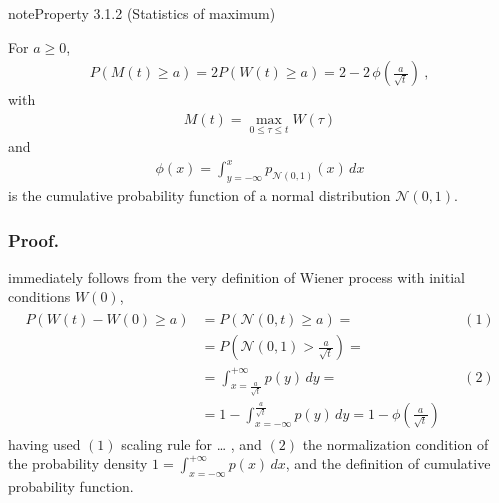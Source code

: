 \documentclass[letterpaper,10pt,english]{jupyterBook}
\begin{document}
\begin{sphinxadmonition}{note}{Property 3.1.2 (Statistics of maximum)}



\sphinxAtStartPar
For \(a \ge 0\),
\begin{equation*}
\begin{split}P\left( M(t) \ge a  \right) = 2 P \left( W(t) \ge a \right) = 2 - 2 \, \phi\left( \frac{a}{\sqrt{t}} \right) \ ,\end{split}
\end{equation*}
\sphinxAtStartPar
with
\begin{equation*}
\begin{split}M(t) = \max_{0 \le \tau \le t} W(\tau)\end{split}
\end{equation*}
\sphinxAtStartPar
and
\begin{equation*}
\begin{split}\phi(x) = \int_{y = -\infty}^{x} p_{\mathscr{N}(0,1)}(x) \, dx\end{split}
\end{equation*}
\sphinxAtStartPar
is the cumulative probability function of a normal distribution \(\mathscr{N}(0,1)\).
\end{sphinxadmonition}
\subsubsection*{Proof.}

\sphinxAtStartPar
{} immediately follows from the very definition of Wiener process with initial conditions \(W(0)\),
\begin{equation*}
\begin{split}\begin{aligned}
  P \left( W(t) - W(0) \ge a \right) 
  & = P \left( \mathscr{N}(0,t) \ge a \right) = && (1) \\
  & = P \left( \mathscr{N}\left(0, 1 \right) > \frac{a}{\sqrt{t}} \right) = \\
  & = \int_{x=\frac{a}{\sqrt{t}}}^{+\infty} p(y) \, dy = && (2) \\
  & = 1 - \int_{x=-\infty}^{\frac{a}{\sqrt{t}}} p(y) \, dy = 1 - \phi \left( \frac{a}{\sqrt{t}}  \right)
\end{aligned}\end{split}
\end{equation*}
\sphinxAtStartPar
having used \((1)\) scaling rule for {\hyperref[\detokenize{ch/prob/transformations:prob-transformations}]{}}… , and \((2)\) the normalization condition of the probability density \(1 = \int_{x = -\infty}^{+\infty} p(x) \, dx\), and the definition of cumulative probability function.
\end{document}
